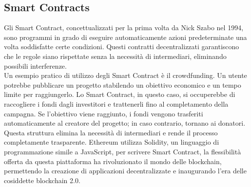 \subsection{Smart Contracts}
Gli Smart Contract, concettualizzati per la prima volta da Nick Szabo nel 1994, sono programmi in grado di eseguire automaticamente azioni predeterminate una volta soddisfatte certe condizioni.
Questi contratti decentralizzati garantiscono che le regole siano rispettate senza la necessità di intermediari, eliminando possibili interferenze.
\\Un esempio pratico di utilizzo degli Smart Contract è il crowdfunding. Un utente potrebbe pubblicare un progetto stabilendo un obiettivo economico e un tempo limite per raggiungerlo. Lo Smart Contract, in questo caso, si occuperebbe di raccogliere i fondi dagli investitori e trattenerli fino al completamento della campagna. Se l’obiettivo viene raggiunto, i fondi vengono trasferiti automaticamente al creatore del progetto; in caso contrario, tornano ai donatori. 
\\Questa struttura elimina la necessità di intermediari e rende il processo completamente trasparente.
Ethereum utilizza Solidity, un linguaggio di programmazione simile a JavaScript, per scrivere Smart Contract, la flessibilità offerta da questa piattaforma ha rivoluzionato il mondo delle blockchain, permettendo la creazione di applicazioni decentralizzate e inaugurando l’era delle cosiddette blockchain 2.0.
